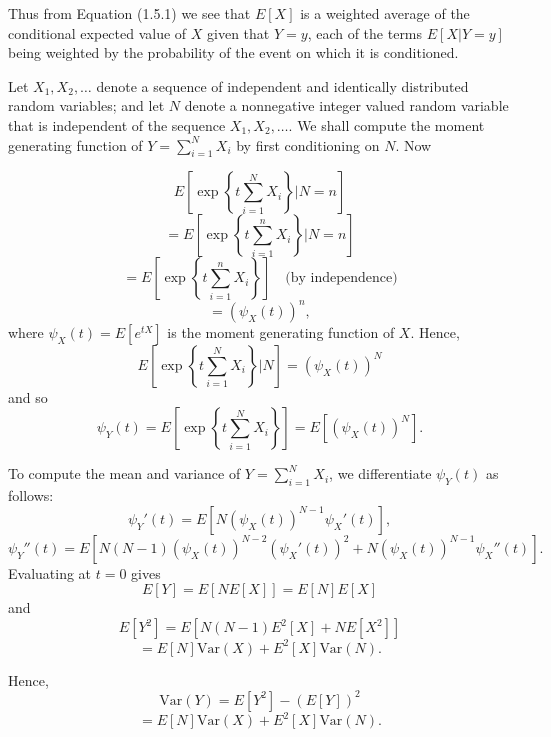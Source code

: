 \documentclass[lang=cn,10pt]{elegantbook}
\begin{document}
Thus from Equation (1.5.1) we see that $E[X]$ is a weighted average of the conditional expected value of $X$ given that $Y = y$, each of the terms $E[X | Y = y]$ being weighted by the probability of the event on which it is conditioned.

\begin{example}
    Let \(X_1, X_2, \ldots\) denote a sequence of independent and identically distributed random variables; and let \(N\) denote a nonnegative integer valued random variable that is independent of the sequence \(X_1, X_2, \ldots\). We shall compute the moment generating function of \(Y = \sum_{i=1}^N X_i\) by first conditioning on \(N\). Now

	\[
	E\left[\exp\left\{t \sum_{i=1}^N X_i\right\} \bigg| N = n\right]
	\]
	\[
	= E\left[\exp\left\{t \sum_{i=1}^n X_i\right\} \bigg| N = n\right]
	\]
	\[
	= E\left[\exp\left\{t \sum_{i=1}^n X_i\right\}\right] \quad \text{(by independence)}
	\]
	\[
	= (\psi_X(t))^n,
	\]
	where \(\psi_X(t) = E[e^{tX}]\) is the moment generating function of \(X\). Hence,
	\[
	E\left[\exp\left\{t \sum_{i=1}^N X_i\right\} \bigg| N\right] = (\psi_X(t))^N
	\]
	and so
	\[
	\psi_Y(t) = E\left[\exp\left\{t \sum_{i=1}^N X_i\right\}\right] = E[(\psi_X(t))^N].
	\]
	
	To compute the mean and variance of \(Y = \sum_{i=1}^N X_i\), we differentiate \(\psi_Y(t)\) as follows:
	\[
	\psi_Y'(t) = E[N (\psi_X(t))^{N-1} \psi_X'(t)],
	\]
	\[
	\psi_Y''(t) = E[N(N - 1) (\psi_X(t))^{N-2} (\psi_X'(t))^2 + N (\psi_X(t))^{N-1} \psi_X''(t)].
	\]
	Evaluating at \(t = 0\) gives
	\[
	E[Y] = E[N E[X]] = E[N] E[X]
	\]
	and
	\[
	E[Y^2] = E[N(N - 1) E^2[X] + N E[X^2]]
	\]
	\[
	= E[N] \text{Var}(X) + E^2[X] \text{Var}(N).
	\]
	
	Hence,
	\[
	\text{Var}(Y) = E[Y^2] - (E[Y])^2
	\]
	\[
	= E[N] \text{Var}(X) + E^2[X] \text{Var}(N).
	\]
\end{example}
\end{document}
